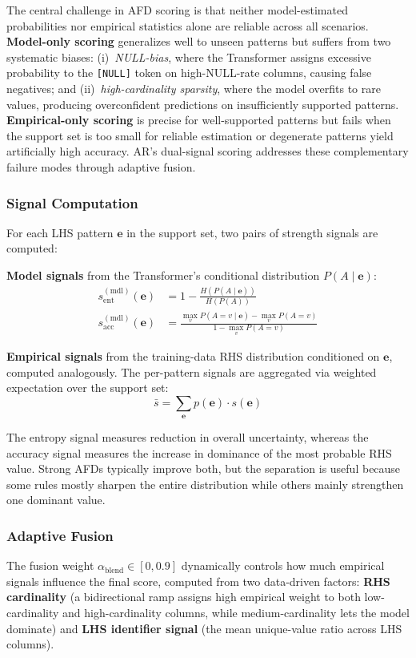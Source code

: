 \documentclass[conference]{IEEEtran}
\begin{document}
The central challenge in AFD scoring is that neither model-estimated probabilities nor empirical statistics alone are reliable across all scenarios. \textbf{Model-only scoring} generalizes well to unseen patterns but suffers from two systematic biases: (i)~\emph{NULL-bias}, where the Transformer assigns excessive probability to the \texttt{[NULL]} token on high-NULL-rate columns, causing false negatives; and (ii)~\emph{high-cardinality sparsity}, where the model overfits to rare values, producing overconfident predictions on insufficiently supported patterns. \textbf{Empirical-only scoring} is precise for well-supported patterns but fails when the support set is too small for reliable estimation or degenerate patterns yield artificially high accuracy. AR's dual-signal scoring addresses these complementary failure modes through adaptive fusion.

\subsubsection{Signal Computation}
For each LHS pattern $\mathbf{e}$ in the support set, two pairs of strength signals are computed:

\textbf{Model signals} from the Transformer's conditional distribution $P(A \mid \mathbf{e})$:
\begin{align}
    s_{\text{ent}}^{(\text{mdl})}(\mathbf{e}) &= 1 - \frac{H(P(A \mid \mathbf{e}))}{H(P(A))} \\
    s_{\text{acc}}^{(\text{mdl})}(\mathbf{e}) &= \frac{\max_v P(A{=}v \mid \mathbf{e}) - \max_v P(A{=}v)}{1 - \max_v P(A{=}v)}
\end{align}

\textbf{Empirical signals} from the training-data RHS distribution conditioned on $\mathbf{e}$, computed analogously. The per-pattern signals are aggregated via weighted expectation over the support set:
\begin{equation}
    \bar{s} = \sum_{\mathbf{e}} p(\mathbf{e}) \cdot s(\mathbf{e})
\end{equation}

The entropy signal measures reduction in overall uncertainty, whereas the accuracy signal measures the increase in dominance of the most probable RHS value. Strong AFDs typically improve both, but the separation is useful because some rules mostly sharpen the entire distribution while others mainly strengthen one dominant value.

\subsubsection{Adaptive Fusion}
The fusion weight $\alpha_{\text{blend}} \in [0, 0.9]$ dynamically controls how much empirical signals influence the final score, computed from two data-driven factors: \textbf{RHS cardinality} (a bidirectional ramp assigns high empirical weight to both low-cardinality and high-cardinality columns, while medium-cardinality lets the model dominate) and \textbf{LHS identifier signal} (the mean unique-value ratio across LHS columns).
\end{document}
